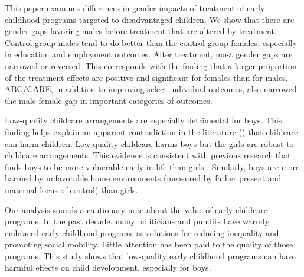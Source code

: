 This paper examines differences in gender impacts of treatment of early childhood programs targeted to disadvantaged children. We show that there are gender gaps favoring males before treatment that are altered by treatment. Control-group males tend to do better than the control-group females, especially in education and employment outcomes. After treatment, most gender gaps are narrowed or reversed. This corresponds with the finding that a larger proportion of the treatment effects are positive and significant for females than for males. ABC/CARE, in addition to improving select individual outcomes, also narrowed the male-female gap in important categories of outcomes.

Low-quality childcare arrangements are especially detrimental for boys. This finding helps explain an apparent contradiction in the literature (\citet{Baker_Gruber_etal_2008_JPE,Baker_Gruber_Milligan_2015_Noncog_Defects,Kottelenberg-Lehrer_2014_Gender-Effects}) that childcare can harm children. Low-quality childcare harms boys but the girls are robust to childcare arrangements. This evidence is consistent with previous research that finds boys to be more vulnerable early in life than girls \citep{golding2016psychology}. Similarly, boys are more harmed by unfavorable home environments (measured by father present and maternal locus of control) than girls.

Our analysis sounds a cautionary note about the value of early childcare programs. In the past decade, many politicians and pundits have warmly embraced early childhood programs as solutions for reducing inequality and promoting social mobility. Little attention has been paid to the quality of those programs. This study shows that low-quality early childhood programs can have harmful effects on child development, especially for boys.

